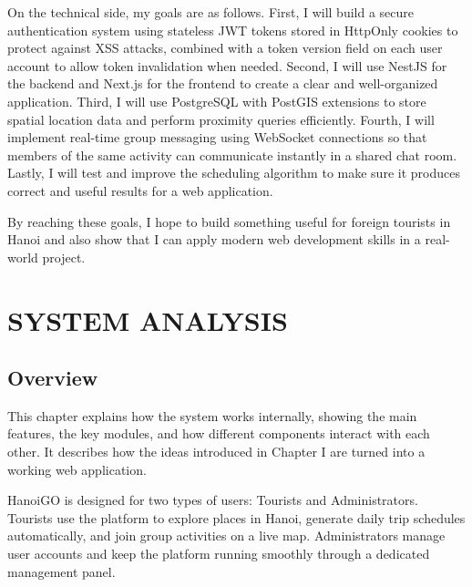 \documentclass[a4paper,12pt]{report}
\begin{document}
On the technical side, my goals are as follows. First, I will build a secure authentication system using stateless JWT tokens stored in HttpOnly cookies to protect against XSS attacks, combined with a token version field on each user account to allow token invalidation when needed. Second, I will use NestJS for the backend and Next.js for the frontend to create a clear and well-organized application. Third, I will use PostgreSQL with PostGIS extensions to store spatial location data and perform proximity queries efficiently. Fourth, I will implement real-time group messaging using WebSocket connections so that members of the same activity can communicate instantly in a shared chat room. Lastly, I will test and improve the scheduling algorithm to make sure it produces correct and useful results for a web application.

By reaching these goals, I hope to build something useful for foreign tourists in Hanoi and also show that I can apply modern web development skills in a real-world project.

\setlength{\parindent}{15pt}
\setlength{\parskip}{0em}
\linespread{1}\selectfont

\chapter{SYSTEM ANALYSIS}

\setlength{\parindent}{0pt}
\setlength{\parskip}{0.6em}
\linespread{1.3}\selectfont
\titlespacing*{\section}{0pt}{12pt}{4pt}

\section{Overview}

This chapter explains how the system works internally, showing the main features, the key modules, and how different components interact with each other. It describes how the ideas introduced in Chapter I are turned into a working web application.
 
HanoiGO is designed for two types of users: Tourists and Administrators. Tourists use the platform to explore places in Hanoi, generate daily trip schedules automatically, and join group activities on a live map. Administrators manage user accounts and keep the platform running smoothly through a dedicated management panel.
 
\end{document}
